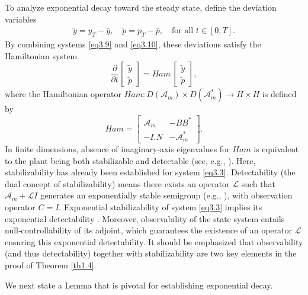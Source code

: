 \documentclass[10pt, a4]{amsart}
\theoremstyle{plain}
\theoremstyle{definition}
\theoremstyle{remark}
\numberwithin{equation}{section}
\def\to{\rightarrow}
\begin{document}
To analyze exponential decay toward the steady state, define the deviation variables
\begin{align}\label{ee5.29}
    \tilde{y} = y_T - \bar{y},\quad \tilde{p} = p_T - \bar{p},\quad \text{for all } t\in [0,T].
\end{align}
By combining systems \eqref{eq3.9} and \eqref{eq3.10}, these deviations satisfy the Hamiltonian system 
\begin{equation}\label{eq3.32}
\frac{\partial}{\partial t}\begin{bmatrix}\tilde{y} \\ \tilde{p}\end{bmatrix} = Ham\, \begin{bmatrix}\tilde{y} \\ \tilde{p}\end{bmatrix},
\end{equation}
where the Hamiltonian operator \(Ham\colon D(\mathcal{A}_m)\times D(\mathcal{A}_m^*)\to H\times H\) is defined by
\[
Ham = \begin{bmatrix} \mathcal{A}_m & -BB^* \\ -I.N & -\mathcal{A}_m^* \end{bmatrix}.
\]
In finite dimensions, absence of imaginary‑axis eigenvalues for $Ham$ is equivalent to the plant being both stabilizable and detectable (see, e.g., \cite{ref46}). Here, stabilizability has already been established for system \eqref{eq3.3}. Detectability (the dual concept of stabilizability) means there exists an operator $\mathcal{L}$ such that $\mathcal{A}_m + \mathcal{L}I$ generates an exponentially stable semigroup (e.g., \cite{ref64,ref52,ref32}), with observation operator $C=I$.  Exponential stabilizability of system \eqref{eq3.3} implies its exponential detectability  \cite{ref38}. Moreover, observability of the state system entails null‑controllability of its adjoint, which guarantees the existence of an operator $\mathcal{L}$ ensuring this exponential detectability. It should be emphasized that observability (and thus detectability) together with stabilizability are two key elements in the proof of Theorem \ref{th1.4}.

We next state a Lemma that is pivotal for establishing exponential decay.
\end{document}
